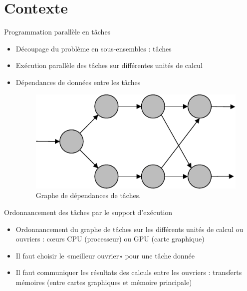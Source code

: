 \documentclass[9pt]{beamer}
\begin{document}
\section{Contexte}

\begin{frame}{\textcolor{inriaGrey}{Programmation parallèle en tâches}}
  \vfill
  \begin{itemize}
    \vfill
  \item Découpage du problème en sous-ensembles : tâches \vfill
  \item Exécution parallèle des tâches sur différentes unités de calcul \vfill
  \item Dépendances de données entre les tâches \vfill
    \begin{figure}
      \centering
      \includegraphics[width=0.5\linewidth]{img/task-deps.pdf}
      \caption{Graphe de dépendances de tâches.}
    \end{figure}
    \vfill
  \end{itemize}
\end{frame}

\begin{frame}{\textcolor{inriaGrey}{Ordonnancement des tâches par le support d'exécution}}
  \begin{itemize}
  \item Ordonnancement du graphe de tâches sur les différents unités de calcul
    ou ouvriers : cœurs CPU (processeur) ou GPU (carte graphique) \vfill
  \item Il faut choisir le «meilleur ouvrier» pour une tâche donnée \vfill
  \item Il faut communiquer les résultats des calculs entre les ouvriers :
    transferts mémoires (entre cartes graphiques et mémoire principale) \vfill
  \end{itemize}
\end{frame}
\end{document}
